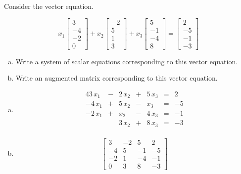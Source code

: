 
\begin{exerciseStatement}


Consider the vector equation.

\[ x_{1} \left[\begin{array}{c}
3 \\
-4 \\
-2 \\
0
\end{array}\right] + x_{2} \left[\begin{array}{c}
-2 \\
5 \\
1 \\
3
\end{array}\right] + x_{3} \left[\begin{array}{c}
5 \\
-1 \\
-4 \\
8
\end{array}\right] = \left[\begin{array}{c}
2 \\
-5 \\
-1 \\
-3
\end{array}\right] \]
\begin{enumerate}[(a)]
\item  Write a system of scalar equations corresponding to this vector equation. 
\item  Write an augmented matrix corresponding to this vector equation. 
\end{enumerate}
    
\end{exerciseStatement}
    
\begin{exerciseAnswer} 

\begin{enumerate}[(a)]
\item 
\begin{alignat*}{4} 3 \, x_{1} &-& 2 \, x_{2} &+& 5 \, x_{3} &=& 2 \\-4 \, x_{1} &+& 5 \, x_{2} &-& x_{3} &=& -5 \\-2 \, x_{1} &+& x_{2} &-& 4 \, x_{3} &=& -1 \\ & & 3 \, x_{2} &+& 8 \, x_{3} &=& -3 \\ \end{alignat*}
            
\item \[ \left[\begin{array}{ccc|c}
3 & -2 & 5 & 2 \\
-4 & 5 & -1 & -5 \\
-2 & 1 & -4 & -1 \\
0 & 3 & 8 & -3
\end{array}\right] \]
\end{enumerate}
    
\end{exerciseAnswer}
    
